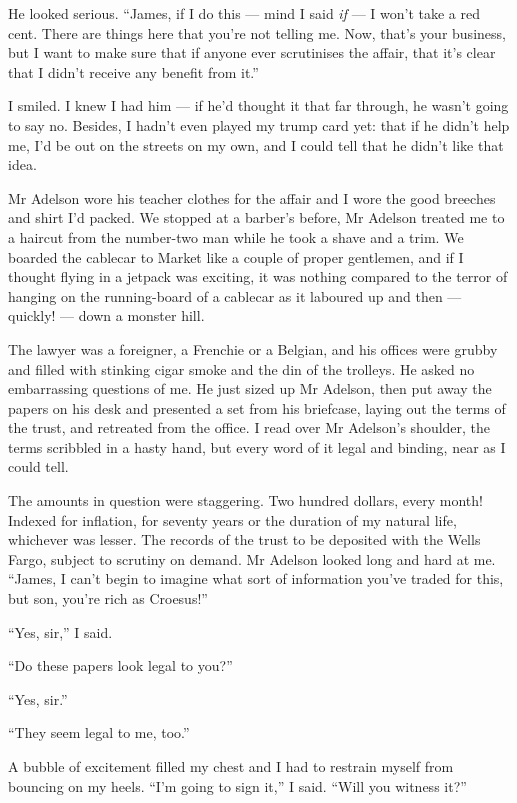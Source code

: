 He looked serious.
``James, if I do this --- mind I said \emph{if} --- I won't take a red cent. 
There are things here that you're not telling me. Now, that's your business, 
but I want to make sure that if anyone ever scrutinises the affair, that it's 
clear that I didn't receive any benefit from it.''

I smiled. I knew I had him --- if he'd thought it that far through,
he wasn't going to say no. Besides, I hadn't even played my trump
card yet: that if he didn't help me, I'd be out on the streets on
my own, and I could tell that he didn't like that idea.

\tb

Mr Adelson wore his teacher clothes for the affair and I wore the
good breeches and shirt I'd packed. We stopped at a barber's
before, Mr Adelson treated me to a haircut from the number-two man
while he took a shave and a trim. We boarded the cablecar to Market
like a couple of proper gentlemen, and if I thought flying in a
jetpack was exciting, it was nothing compared to the terror of
hanging on the running-board of a cablecar as it laboured up and
then --- quickly! --- down a monster hill.

The lawyer was a foreigner, a Frenchie or a Belgian, and his
offices were grubby and filled with stinking cigar smoke and the
din of the trolleys. He asked no embarrassing questions of me. He
just sized up Mr Adelson, then put away the papers on his desk and
presented a set from his briefcase, laying out the terms of the
trust, and retreated from the office. I read over Mr Adelson's
shoulder, the terms scribbled in a hasty hand, but every word of it
legal and binding, near as I could tell.

The amounts in question were staggering. Two hundred dollars, every
month! Indexed for inflation, for seventy years or the duration of
my natural life, whichever was lesser. The records of the trust to
be deposited with the Wells Fargo, subject to scrutiny on demand.
Mr Adelson looked long and hard at me.
``James, I can't begin to imagine what sort of information you've traded for 
this, but son, you're rich as Croesus!''

``Yes, sir,'' I said.

``Do these papers look legal to you?''

``Yes, sir.''

``They seem legal to me, too.''

A bubble of excitement filled my chest and I had to restrain myself
from bouncing on my heels. ``I'm going to sign it,'' I said.
``Will you witness it?''

